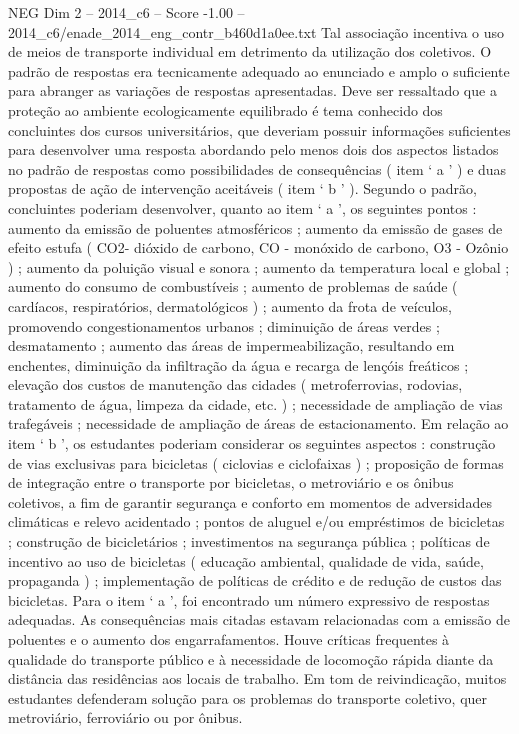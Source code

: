 \begin{textsample}{NEG Dim 2 – 2014\_c6 – Score -1.00 – 2014\_c6/enade\_2014\_eng\_contr\_b460d1a0ee.txt}
Tal associação incentiva o uso de meios de transporte individual em detrimento da utilização dos coletivos.
O padrão de respostas era tecnicamente adequado ao enunciado e amplo o suficiente para abranger as variações de respostas apresentadas.
Deve ser ressaltado que a proteção ao ambiente ecologicamente equilibrado é tema conhecido dos concluintes dos cursos universitários, que deveriam possuir informações suficientes para desenvolver uma resposta abordando pelo menos dois dos aspectos listados no padrão de respostas como possibilidades de consequências ( item ‘ a ’ ) e duas propostas de ação de intervenção aceitáveis ( item ‘ b ’ ).
Segundo o padrão, concluintes poderiam desenvolver, quanto ao item ‘ a ’, os seguintes pontos : aumento da emissão de poluentes atmosféricos ; aumento da emissão de gases de efeito estufa ( CO2- dióxido de carbono, CO - monóxido de carbono, O3 - Ozônio ) ; aumento da poluição visual e sonora ; aumento da temperatura local e global ; aumento do consumo de combustíveis ; aumento de problemas de saúde ( cardíacos, respiratórios, dermatológicos ) ; aumento da frota de veículos, promovendo congestionamentos urbanos ; diminuição de áreas verdes ; desmatamento ; aumento das áreas de impermeabilização, resultando em enchentes, diminuição da infiltração da água e recarga de lençóis freáticos ; elevação dos custos de manutenção das cidades ( metroferrovias, rodovias, tratamento de água, limpeza da cidade, etc. ) ; necessidade de ampliação de vias trafegáveis ; necessidade de ampliação de áreas de estacionamento.
Em relação ao item ‘ b ’, os estudantes poderiam considerar os seguintes aspectos : construção de vias exclusivas para bicicletas ( ciclovias e ciclofaixas ) ; proposição de formas de integração entre o transporte por bicicletas, o metroviário e os ônibus coletivos, a fim de garantir segurança e conforto em momentos de adversidades climáticas e relevo acidentado ; pontos de aluguel e/ou empréstimos de bicicletas ; construção de bicicletários ; investimentos na segurança pública ; políticas de incentivo ao uso de bicicletas ( educação ambiental, qualidade de vida, saúde, propaganda ) ; implementação de políticas de crédito e de redução de custos das bicicletas.
Para o item ‘ a ’, foi encontrado um número expressivo de respostas adequadas.
As consequências mais citadas estavam relacionadas com a emissão de poluentes e o aumento dos engarrafamentos.
Houve críticas frequentes à qualidade do transporte público e à necessidade de locomoção rápida diante da distância das residências aos locais de trabalho.
Em tom de reivindicação, muitos estudantes defenderam solução para os problemas do transporte coletivo, quer metroviário, ferroviário ou por ônibus.

\end{textsample}
